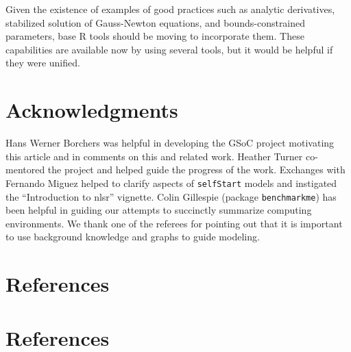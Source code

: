Given the existence of examples of good practices such as analytic derivatives,
stabilized solution of Gauss-Newton equations, and bounds-constrained parameters,
base R tools should
be moving to incorporate them. These capabilities are available now by
using several tools, but it would be helpful if they were unified.

\hypertarget{acknowledgments}{%
\section{Acknowledgments}\label{acknowledgments}}

Hans Werner Borchers was helpful in developing the GSoC project motivating this article
and in comments on this and related work. Heather Turner co-mentored the project
and helped guide the progress of the work. Exchanges with Fernando Miguez helped to
clarify aspects of \texttt{selfStart} models and instigated the ``Introduction to nlsr''
vignette. Colin Gillespie (package \texttt{benchmarkme}) has been helpful in guiding our
attempts to succinctly summarize computing environments. We thank one of the referees
for pointing out that it is important to use background knowledge and graphs to
guide modeling.

\hypertarget{references}{%
\section{References}\label{references}}

\hypertarget{references-1}{%
\section*{References}\label{references-1}}

